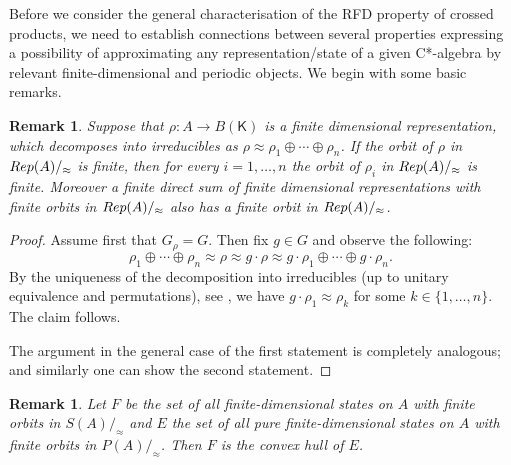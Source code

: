 \documentclass[11 pt, leqno, hidelinks]{amsart}%
\theoremstyle{plain}
\newtheorem{remark}[theorem]{Remark}
\numberwithin{equation}{section}
\newcommand{\Rep}{\textup{Rep}}
\newcommand{\Kil}{\mathsf{K}}
\begin{document}
Before we consider the general characterisation of the RFD property of crossed products, we need to establish connections between several properties expressing a possibility of approximating any representation/state of a given C*-algebra by relevant finite-dimensional and periodic objects.
 We begin with some basic remarks.


\begin{remark}\label{remark:trivial2}
	Suppose that $\rho:A \to B(\Kil)$ is a finite dimensional representation, which decomposes into irreducibles as $\rho\approx \rho_1 \oplus \cdots \oplus \rho_n$. If the orbit of $\rho$ in  $\Rep(A)/_\approx$ is finite, then for every $i=1,\ldots, n$ the orbit of $\rho_i$ in $\Rep(A)/_\approx$ is finite.
	Moreover a finite direct sum of finite dimensional representations with finite orbits in  $\Rep(A)/_\approx$ also has a finite orbit in $\Rep(A)/_\approx$.
	
\end{remark}
\begin{proof}
	Assume first that $G_\rho=G$. Then fix $g \in G$ and observe the following:
	\[\rho_1 \oplus \cdots \oplus \rho_n \approx \rho \approx g \cdot \rho \approx g \cdot\rho_1 \oplus \cdots \oplus g \cdot \rho_n. \]
	By the uniqueness of the decomposition into irreducibles (up to unitary equivalence and permutations), see \cite[Subsection 2.3.5]{Dixmier}, we have
	$g \cdot\rho_1 \approx \rho_k$ for some $k\in \{1, \ldots, n\}$. The claim follows.
	
	The argument in the general case of the first statement is completely analogous; and similarly one can show the second statement.
\end{proof}


\begin{remark}\label{remark:FE}
	Let  $F$ be the set of all finite-dimensional states on $A$ with finite orbits in $S(A)/_\approx$  and $E$ the set of all pure finite-dimensional states on $A$ with finite orbits in $P(A)/_\approx$.
	Then  $F$ is the convex hull of $E$.
\end{remark}
\end{document}
